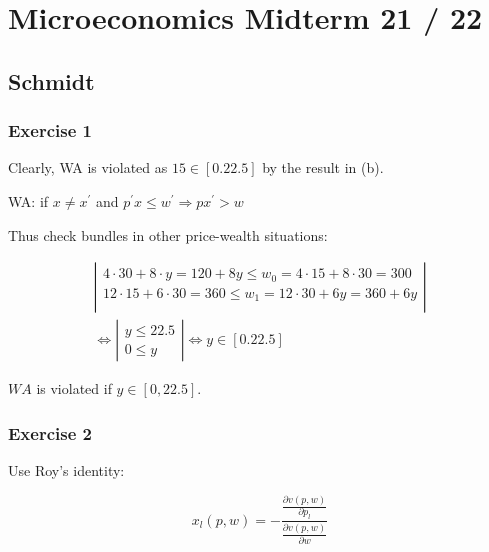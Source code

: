 \section{Microeconomics Midterm 21 / 22}

{
\subsection*{Schmidt}

{
\subsubsection*{Exercise 1}

\begin{enumerate}[label=(\alph*)]
{\item 
Clearly, WA is violated as $15 \in[0.22 .5]$ by the result in (b).
}
{\item 
WA: if $x \neq x^{\prime}$ and $p^{\prime} x \leqslant w^{\prime} \Rightarrow p x^{\prime}>w$

Thus check bundles in other price-wealth situations:

$$
\begin{aligned}
\left|\begin{array}{l}
4 \cdot 30+8 \cdot y=120+8 y \leqslant w_{0}=4 \cdot 15+8 \cdot 30=300 \\
12 \cdot 15+6 \cdot 30=360 \leqslant w_{1}=12 \cdot 30+6 y=360+6 y \\
\end{array}\right| \\
\Leftrightarrow\left|\begin{array}{l}
y \leqslant 22.5 \\
0 \leqslant y
\end{array}\right|
\Longleftrightarrow y \in[0.22 .5]
\end{aligned}
$$

$W A$ is violated if $y \in[0,22.5]$.
}
\end{enumerate}
}
{
\subsubsection*{Exercise 2}

\begin{enumerate}[label=(\alph*)]
{\item 
Use Roy's identity:

$$
x_{l}(p, w)=-\frac{\frac{\partial v(p, w)}{\partial p_{l}}}{\frac{\partial v(p, w)}{\partial w}}
$$

}
\end{enumerate}}}
